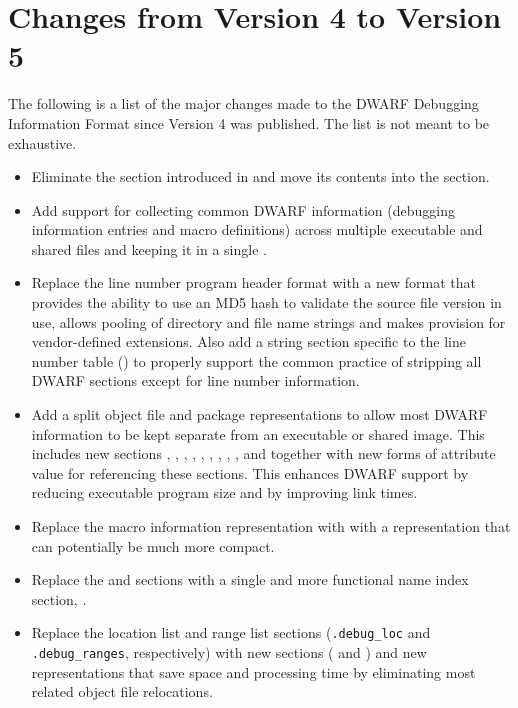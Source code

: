 \section{Changes from Version 4 to Version 5}
The following is a list of the major changes made to the 
DWARF Debugging Information Format since Version 4 was published. 
The list is not meant to be exhaustive.
\begin{itemize}
\item Eliminate the \dotdebugtypes{}
section introduced in \DWARFVersionIV{} 
and move its contents into the \dotdebuginfo{} section.
\item Add support for collecting common DWARF information 
(debugging information entries and macro definitions)
across multiple executable and shared files and keeping it in a single
.
\item Replace the line number program header format with a new 
format that 
provides the ability to use an MD5 hash to validate 
the source file version in use, allows pooling 
of directory and file name strings and makes provision for vendor-defined
extensions. Also add a string section specific to the line number table 
(\dotdebuglinestr)
to properly support the common practice of stripping all DWARF sections
except for line number information.
\item Add a split object file and package representations to allow most 
DWARF information to be kept separate from an executable 
or shared image. This includes new sections 
\dotdebugaddr, \dotdebugstroffsets, \dotdebugabbrevdwo, \dotdebuginfodwo, 
\dotdebuglinedwo, \dotdebugloclistsdwo, \dotdebugmacrodwo, \dotdebugstrdwo,
\dotdebugstroffsetsdwo, \dotdebugcuindex{} and \dotdebugtuindex{} 
together with new forms of attribute value for referencing these sections.
This enhances DWARF support by reducing executable program size and
by improving link times.
\item Replace the \dotdebugmacinfo{} macro information representation with
with a \dotdebugmacro{} representation that can potentially be much more compact.
\item Replace the \dotdebugpubnames{} and \dotdebugpubtypes{} sections
with a single and more functional name index section, \dotdebugnames{}.

\item Replace the location list and range list sections (\texttt{.debug\_loc} 
and \texttt{.debug\_ranges}, respectively) with new sections (\dotdebugloclists{} 
and \dotdebugrnglists) and new representations that
save space and processing time by eliminating most related
object file relocations.


\end{itemize}
